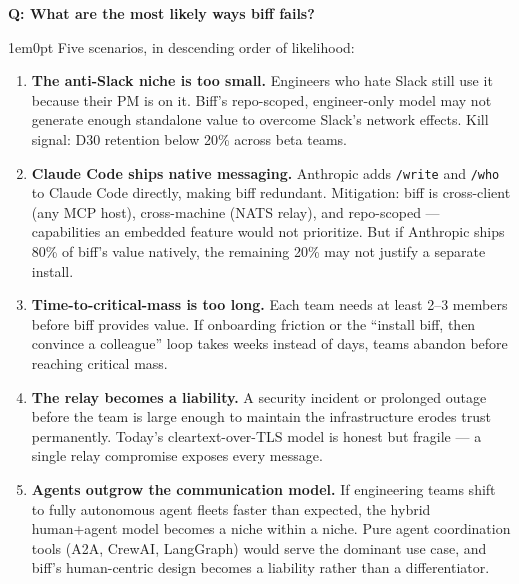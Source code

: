 \documentclass[11pt,letterpaper]{article}
\newcounter{faqnum}
\newenvironment{faqpair}[1]{%
  \needspace{4\baselineskip}%
  \vspace{0.5em}%
  \refstepcounter{faqnum}%
  \noindent\textbf{\color{SectionBlue}Q\thefaqnum: #1}\par\nopagebreak[4]%
  \vspace{0.2em}%
  \begin{adjustwidth}{1em}{0pt}%
  \setlength{\parindent}{0pt}%
}{%
  \end{adjustwidth}%
  \vspace{0.5em}%
}
\begin{document}
\begin{faqpair}{What are the most likely ways biff fails?}\label{faq:failure-modes}
  Five scenarios, in descending order of likelihood:

  \begin{enumerate}[leftmargin=1.5em]
    \item \textbf{The anti-Slack niche is too small.} Engineers who hate
    Slack still use it because their PM is on it. Biff's repo-scoped,
    engineer-only model may not generate enough standalone value to
    overcome Slack's network effects. Kill signal: D30 retention below
    20\% across beta teams.

    \item \textbf{Claude Code ships native messaging.} Anthropic adds
    \texttt{/write} and \texttt{/who} to Claude Code directly, making
    biff redundant. Mitigation: biff is cross-client (any MCP host),
    cross-machine (NATS relay), and repo-scoped --- capabilities an
    embedded feature would not prioritize. But if Anthropic ships 80\%
    of biff's value natively, the remaining 20\% may not justify a
    separate install.

    \item \textbf{Time-to-critical-mass is too long.} Each team needs
    at least 2--3 members before biff provides value. If onboarding
    friction or the ``install biff, then convince a colleague'' loop
    takes weeks instead of days, teams abandon before reaching critical
    mass.

    \item \textbf{The relay becomes a liability.} A security incident or
    prolonged outage before the team is large enough to maintain the
    infrastructure erodes trust permanently. Today's cleartext-over-TLS
    model is honest but fragile --- a single relay compromise exposes
    every message.

    \item \textbf{Agents outgrow the communication model.} If
    engineering teams shift to fully autonomous agent fleets faster than
    expected, the hybrid human+agent model becomes a niche within a
    niche. Pure agent coordination tools (A2A, CrewAI, LangGraph) would
    serve the dominant use case, and biff's human-centric design becomes
    a liability rather than a differentiator.
  \end{enumerate}
\end{faqpair}

\pagebreak

\end{document}
